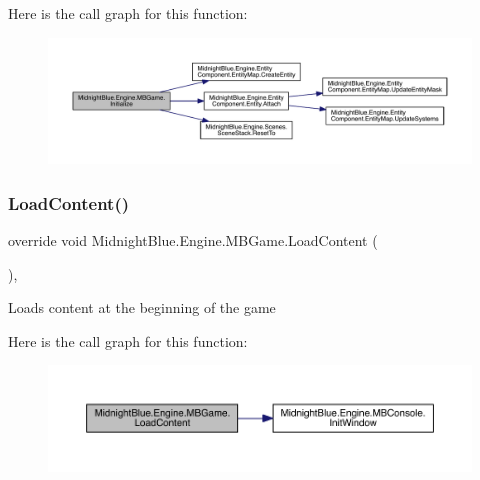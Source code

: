 Here is the call graph for this function\+:
\nopagebreak
\begin{figure}[H]
\begin{center}
\leavevmode
\includegraphics[width=350pt]{class_midnight_blue_1_1_engine_1_1_m_b_game_a0e02fa538b3344104374f61a058516f8_cgraph}
\end{center}
\end{figure}
\hypertarget{class_midnight_blue_1_1_engine_1_1_m_b_game_ad37b75158d6181720f57cad9cb78df56}{}\label{class_midnight_blue_1_1_engine_1_1_m_b_game_ad37b75158d6181720f57cad9cb78df56} 
\subsubsection{\texorpdfstring{Load\+Content()}{LoadContent()}}
{\footnotesize\ttfamily override void Midnight\+Blue.\+Engine.\+M\+B\+Game.\+Load\+Content (\begin{DoxyParamCaption}{ }\end{DoxyParamCaption})\hspace{0.3cm}{\ttfamily [inline]}, {\ttfamily [protected]}}



Loads content at the beginning of the game 

Here is the call graph for this function\+:
\nopagebreak
\begin{figure}[H]
\begin{center}
\leavevmode
\includegraphics[width=350pt]{class_midnight_blue_1_1_engine_1_1_m_b_game_ad37b75158d6181720f57cad9cb78df56_cgraph}
\end{center}
\end{figure}
\hypertarget{class_midnight_blue_1_1_engine_1_1_m_b_game_a10a451d83e4163e9bb1c9bcdc6719db3}{}\label{class_midnight_blue_1_1_engine_1_1_m_b_game_a10a451d83e4163e9bb1c9bcdc6719db3} 
